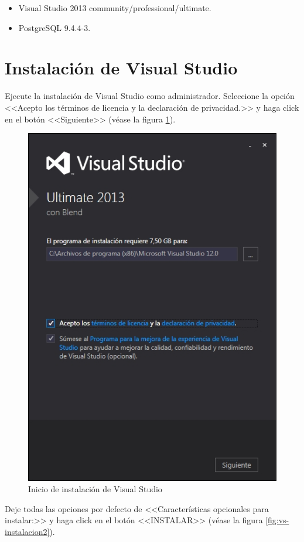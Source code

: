 \begin{itemize}
	\item Visual Studio 2013 community/professional/ultimate.
	
	\item PostgreSQL 9.4.4-3.
\end{itemize}

\newpage

\section{Instalaci\'{o}n de Visual Studio}
	
Ejecute la instalaci\'{o}n de Visual Studio como administrador. Seleccione la opci\'{o}n <<Acepto los t\'{e}rminos de licencia y la declaraci\'{o}n de privacidad.>> y haga click en el bot\'{o}n <<Siguiente>> (v\'{e}ase la figura \ref{fig:vs-instalacion1}).

\begin{figure}[H]
  \centering
  \includegraphics[width=.8\linewidth]{./img/vs-instalacion1.jpg}
\caption[Inicio de instalaci\'{o}n de Visual Studio]{Inicio de instalaci\'{o}n de Visual Studio\label{fig:vs-instalacion1}}
\end{figure}
\newpage
Deje todas las opciones por defecto de <<Caracter\'{i}sticas opcionales para instalar:>> y haga click en el bot\'{o}n <<INSTALAR>> (v\'{e}ase la figura \ref{fig:vs-instalacion2}).	

